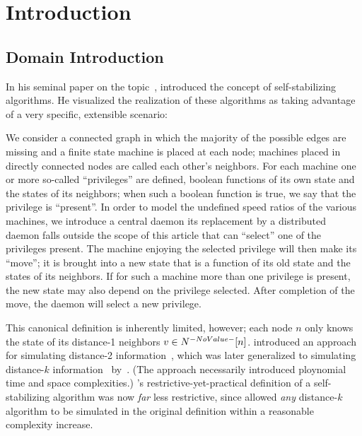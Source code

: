 \section{Introduction}
\label{sec:introduction}
\subsection{Domain Introduction}
In his seminal paper on the topic~\autocite{Dijkstra:1974:SSS:361179.361202},
  \citeauthor{Dijkstra:1974:SSS:361179.361202} introduced the concept of
  self-stabilizing algorithms.
He visualized the realization of these algorithms as taking advantage of
  a very specific, extensible scenario:
\begin{displayquote}
  We consider a connected graph in which
    the majority of the possible edges are missing and
    a finite state machine is placed at each node;
    machines placed in directly connected nodes are called each other's neighbors.
  For each machine one or more so-called \enquote{privileges} are defined,
    \ie boolean functions of its own state and the states of its neighbors;
    when such a boolean function is true,
    we say that the privilege is \enquote{present}.
  In order to model the undefined speed ratios of the various machines,
    we introduce a central daemon \Dash
    its replacement by a distributed daemon falls outside the scope of this article \Dash
    that can \enquote{select} one of the privileges present.
  The machine enjoying the selected privilege will then make its \enquote{move};
    \ie it is brought into a new state that is a function of
    its old state and the states of its neighbors.
  If for such a machine more than one privilege is present,
    the new state may also depend on the privilege selected.
  After completion of the move, the daemon will select a new privilege.
\end{displayquote}
This canonical definition is inherently limited, however;
  each node $n$ only knows the state of its distance-1 neighbors $v \in \ClosedNeighborhood{n}$.
\citeauthor{gairing:distance-2} introduced an approach for
  simulating distance-2 information~\autocite{gairing:distance-2},
  which was later generalized to simulating distance-$k$
  information~\autocite{goddard:ssa--k-distance} by~\citeauthor{goddard:ssa--k-distance}.
  (The approach necessarily introduced ploynomial time and space complexities.)
\citeauthor{Dijkstra:1974:SSS:361179.361202}'s restrictive-yet-practical definition
  of a self-stabilizing algorithm
  was now \emph{far} less restrictive,
  since \citeauthor{goddard:ssa--k-distance} allowed \emph{any} distance-$k$ algorithm
  to be simulated in the original definition within a reasonable complexity increase.

